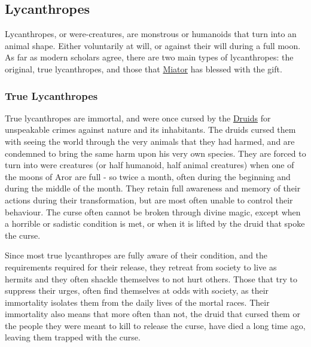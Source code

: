 \subsection{Lycanthropes}
\label{sec:Lycanthropes}

Lycanthropes, or were-creatures, are monstrous or humanoids that turn into an
animal shape. Either voluntarily at will, or against their will during a full
moon. As far as modern scholars agree, there are two main types of
lycanthropes: the original, true lycanthropes, and those that
\hyperref[sec:Three Kings]{Miator} has blessed with the gift.

\subsubsection{True Lycanthropes}
\label{sec:True Lycanthropes}


True lycanthropes are immortal, and were once cursed by the
\hyperref[sec:Druid]{Druids} for unspeakable crimes against nature and its
inhabitants. The druids cursed them with seeing the world through the very
animals that they had harmed, and are condemned to bring the same harm upon
his very own species. They are forced to turn into were creatures (or half
humanoid, half animal creatures) when one of the moons of Aror are full - so
twice a month, often during the beginning and during the middle of the
month. They retain full awareness and memory of their actions during their
transformation, but are most often unable to control their behaviour. The
curse often cannot be broken through divine magic, except when a horrible or
sadistic condition is met, or when it is lifted by the druid that spoke the
curse.

Since most true lycanthropes are fully aware of their condition, and the
requirements required for their release, they retreat from society to live as
hermits and they often shackle themselves to not hurt others. Those that try
to suppress their urges, often find themselves at odds with society, as their
immortality isolates them from the daily lives of the mortal races. Their
immortality also means that more often than not, the druid that cursed them or
the people they were meant to kill to release the curse, have died a long time
ago, leaving them trapped with the curse.

